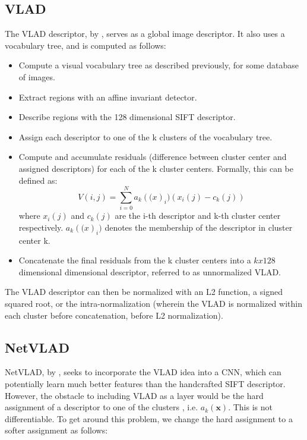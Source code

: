 \subsection{VLAD}
The VLAD descriptor, by \cite{Arandlejovic2013}, serves as a global image descriptor. It also uses a vocabulary tree, and is computed as follows:

\begin{itemize}
	\item Compute a visual vocabulary tree as described previously, for some database of images. \\
	\item Extract regions with an affine invariant detector.\\
	\item Describe regions with the 128 dimensional SIFT descriptor. \\
	\item Assign each descriptor to one of the k clusters of the vocabulary tree.\\
	\item Compute and accumulate residuals (difference between cluster center and assigned descriptors) for each of the k cluster centers. Formally, this can
	be defined as:
	\[V(i, j) = \sum_{i=0}^{N}a_k(\mathcal(x)_i)(x_i(j) - c_k(j))\]
	where $x_i(j)$ and $c_k(j)$ are the i-th descriptor and k-th cluster center respectively. $a_k(\mathcal(x)_i)$ denotes the membership of the descriptor in 
	cluster center k.\\
	\item Concatenate the final residuals from the k cluster centers into a $k x 128$ dimensional dimensional descriptor, referred to as unnormalized VLAD.
\end{itemize}

The VLAD descriptor can then be normalized with an L2 function, a signed squared root, or the intra-normalization (wherein the VLAD is normalized within each 
cluster before concatenation, before L2 normalization).

\subsection{NetVLAD}
NetVLAD, by \cite{Arandlejovic2015}, seeks to incorporate the VLAD idea into a CNN, which can potentially learn much better features than the handcrafted SIFT descriptor. However, the 
obstacle to including VLAD as a layer would be the hard assignment of a descriptor to one of the clusters , i.e. $a_k(\mathbf{x})$. This is not differentiable. 
To get around this problem, we change the hard assignment to a softer assignment as follows:

